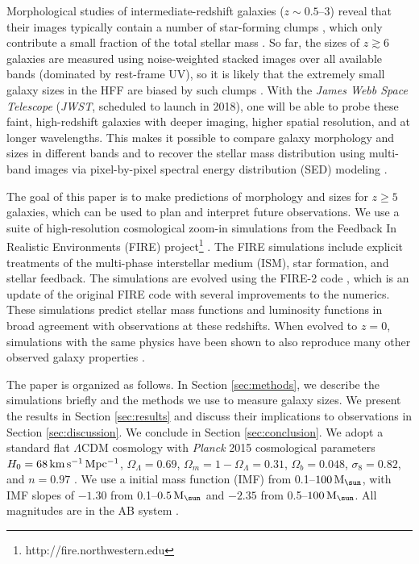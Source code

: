 \documentclass[useAMS,usenatbib]{mn2e}
\newcommand{\Msun}{{\rm M}_{\sun}}
\newcommand{\LCDM}{$\Lambda$CDM}
\begin{document}
Morphological studies of intermediate-redshift galaxies ($z\sim0.5$--3) reveal that their images typically contain a number of star-forming clumps \citep[e.g.][]{guo.2015:clumpy.galaxy.candels}, which only contribute a small fraction of the total stellar mass \citep[e.g.][]{wuyts.2012:candels.clumps}. So far, the sizes of $z\gtrsim6$ galaxies are measured using noise-weighted stacked images over all available bands (dominated by rest-frame UV), so it is likely that the extremely small galaxy sizes in the HFF are biased by such clumps \citep[e.g.][]{vanzella.2017:globular.formation}. With the {\em James Webb Space Telescope} ({\em JWST}, scheduled to launch in 2018), one will be able to probe these faint, high-redshift galaxies with deeper imaging, higher spatial resolution, and at longer wavelengths. This makes it possible to compare galaxy morphology and sizes in different bands and to recover the stellar mass distribution using multi-band images via pixel-by-pixel spectral energy distribution (SED) modeling \citep[e.g.][]{smith.hayward.2015:sed.modeling}.

The goal of this paper is to make predictions of morphology and sizes for $z\geq5$ galaxies, which can be used to plan and interpret future observations. We use a suite of high-resolution cosmological zoom-in simulations from the Feedback In Realistic Environments (FIRE) project\footnote{http://fire.northwestern.edu} \citep{hopkins.2014:fire.galaxy}. The FIRE simulations include explicit treatments of the multi-phase interstellar medium (ISM), star formation, and stellar feedback. The simulations are evolved using the FIRE-2 code \citep{hopkins.2017:fire2.numerics}, which is an update of the original FIRE code with several improvements to the numerics. These simulations predict stellar mass functions and luminosity functions in broad agreement with observations at these redshifts. When evolved to $z=0$, simulations with the same physics have been shown to also reproduce many other observed galaxy properties \citep[][and references therein]{hopkins.2017:fire2.numerics}.

The paper is organized as follows. In Section \ref{sec:methods}, we describe the simulations briefly and the methods we use to measure galaxy sizes. We present the results in Section \ref{sec:results} and discuss their implications to observations in Section \ref{sec:discussion}. We conclude in Section \ref{sec:conclusion}. We adopt a standard flat {\LCDM} cosmology with {\it Planck} 2015 cosmological parameters $H_0=68 {\rm\,km\,s^{-1}\,Mpc^{-1}}$, $\Omega_{\Lambda}=0.69$, $\Omega_{m}=1-\Omega_{\Lambda}=0.31$, $\Omega_b=0.048$, $\sigma_8=0.82$, and $n=0.97$ \citep{planck.2016:cosmo.param}. We use a \citet{kroupa.2002:imf} initial mass function (IMF) from 0.1--$100\,\Msun$, with IMF slopes of $-1.30$ from 0.1--$0.5\,\Msun$ and $-2.35$ from 0.5--$100\,\Msun$. All magnitudes are in the AB system \citep{oke.gunn.1983:ab.system}.
\end{document}
